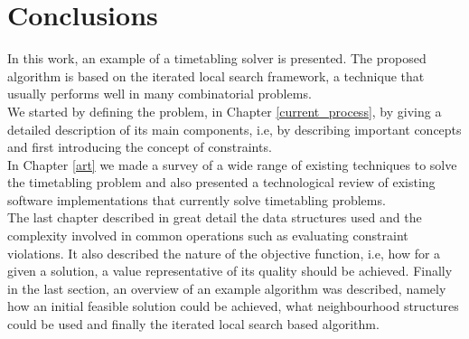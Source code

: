 
\chapter{Conclusions} %

\label{conclusion} %


In this work, an example of a timetabling solver is presented. The proposed algorithm is based on the iterated local search framework, a technique that usually performs well in many combinatorial problems. \\
We started by defining the problem, in Chapter \ref{current_process}, by giving a detailed description of its main components, i.e, by describing important concepts and first introducing the concept of constraints.\\
In Chapter \ref{art} we made a survey of a wide range of existing techniques to solve the timetabling problem and also presented a technological review of existing software implementations that currently solve timetabling problems.\\
The last chapter described in great detail the data structures used and the complexity involved in common operations such as evaluating constraint violations. It also described the nature of the objective function, i.e, how for a given a solution, a value representative of its quality should be achieved. Finally in the last section, an overview of an example algorithm was described, namely how an initial feasible solution could be achieved, what neighbourhood structures could be used and finally the iterated local search based algorithm.\par
